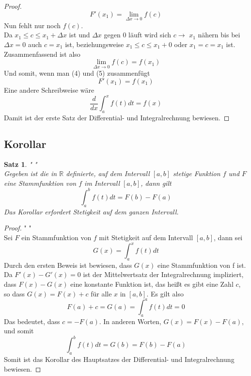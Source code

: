 \documentclass[fontsize=12pt,paper=a4,DIV12,cleardoublepage=empty, 
liststotoc,idxtotoc,bibtotoc]{article}
\newcommand{\RR}{\mathbb{R}}
\theoremstyle{plain}
\newtheorem{satz}{Satz}[subsection]
\theoremstyle{definition}
\begin{document}
\begin{proof}
\begin{equation}
			F'(x_1)=\lim \limits_{\Delta x \to 0}f(c)
		\end{equation}
		Nun fehlt nur noch $f(c)$.\\ Da $x_1 \leq c \leq x_1+\Delta x$ ist und $\Delta x$ gegen $0$ läuft wird sich $c\to$ $x_1$ nähern bis bei $\Delta x=0$ auch $c = x_1$ ist, beziehungsweise $x_1 \leq c \leq x_1 + 0$ oder $x_1 = c = x_1$ ist.\\Zusammenfassend ist also
		\begin{equation}
			\lim \limits_{\Delta x \to 0} f(c) = f(x_1)
		\end{equation}
		Und somit, wenn man (4) und (5) zusammenfügt
		\begin{equation*}
			F'(x_1)=f(x_1)
		\end{equation*}
		Eine andere Schreibweise wäre
		\begin{equation*}
			\frac{d}{dx}\int_{a}^{x}f(t)dt=f(x)
		\end{equation*}
		Damit ist der erste Satz der Differential- und Integralrechnung bewiesen.
	\end{proof}
	\newpage
	
	
	\subsection{Korollar}
	\begin{satz}" "\\
		Gegeben ist die in $\RR$ definierte, auf dem Intervall $[a, b]$ stetige Funktion $f$  und $F$ eine Stammfunktion von $f$ im Intervall $[a, b]$, dann gilt
		\begin{equation*}
			\int_{a}^{b}f(t)dt=F(b)-F(a)
		\end{equation*}
		Das Korollar erfordert Stetigkeit auf dem ganzen Intervall.
	\end{satz}

	\begin{proof}" "\\
		Sei $F$ ein Stammfunktion von $f$ mit Stetigkeit auf dem Intervall $[a, b]$, dann sei
		\begin{equation*}
			G(x)=\int_{a}^{x}f(t)dt
		\end{equation*}
		Durch den ersten Beweis ist bewiesen, dass $G(x)$ eine Stammfunktion von f ist. Da $F'(x)-G'(x)=0$ ist der Mittelwertsatz der Integralrechnung impliziert, dass $F(x)-G(x)$ eine konstante Funktion ist, das heißt es gibt eine Zahl $c$, so dass $G(x)=F(x)+c$ für alle $x$ in $[a, b]$. Es gilt also
		\begin{equation*}
			F(a)+c=G(a)=\int_{a}^{a}f(t)dt=0
		\end{equation*}
		Das bedeutet, dass $c=-F(a)$. In anderen Worten, $G(x)=F(x)-F(a)$, und somit
		\begin{equation*}
			\int_{a}^{b}f(t)dt=G(b)=F(b)-F(a)
		\end{equation*}
		Somit ist das Korollar des Hauptsatzes der Differential- und Integralrechnung bewiesen.
	\end{proof}	
	\newpage
	
\end{document}
